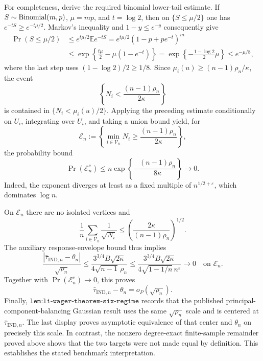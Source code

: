 For completeness, derive the required binomial lower-tail estimate.  If \(S\sim{\rm Binomial}(m,p)\), \(\mu=mp\), and \(t=\log2\), then on \(\{S\le\mu/2\}\) one has \(e^{-tS}\ge e^{-t\mu/2}\).  Markov's inequality and \(1-y\le e^{-y}\) consequently give
\[
\begin{aligned}
\Pr(S\le\mu/2)
&\le e^{t\mu/2}\mathbb E e^{-tS}
=e^{t\mu/2}(1-p+pe^{-t})^m\\
&\le\exp\!\left\{\frac{t\mu}{2}-\mu(1-e^{-t})\right\}
=\exp\!\left\{-\frac{1-\log2}{2}\mu\right\}
\le e^{-\mu/8},
\end{aligned}
\]
where the last step uses \((1-\log2)/2\ge1/8\).  Since \(\mu_i(u)\ge(n-1)\rho_n/\kappa\), the event
\[
\left\{N_i<\frac{(n-1)\rho_n}{2\kappa}\right\}
\]
is contained in \(\{N_i<\mu_i(u)/2\}\).  Applying the preceding estimate conditionally on \(U_i\), integrating over \(U_i\), and taking a union bound yield, for
\[
\mathcal E_n:=\left\{\min_{i\in\mathcal V_n}N_i
\ge\frac{(n-1)\rho_n}{2\kappa}\right\},
\]
the probability bound
\[
\Pr(\mathcal E_n^c)
\le n\exp\!\left\{-\frac{(n-1)\rho_n}{8\kappa}\right\}
\longrightarrow0.
\]
Indeed, the exponent diverges at least as a fixed multiple of \(n^{1/2+\varepsilon}\), which dominates \(\log n\).

On \(\mathcal E_n\) there are no isolated vertices and
\[
\frac1n\sum_{i\in\mathcal V_n}\frac1{\sqrt{N_i}}
\le\left(\frac{2\kappa}{(n-1)\rho_n}\right)^{1/2}.
\]
The auxiliary response-envelope bound thus implies
\[
\frac{\left|\bar\tau_{\mathrm{IND},n}-\theta_n\right|}{\sqrt{\rho_n}}
\le\frac{3^{3/4}B\sqrt{2\kappa}}{4\sqrt{n-1}\,\rho_n}
\le\frac{3^{3/4}B\sqrt{2\kappa}}{4\sqrt{1-1/n}\,n^{\varepsilon}}
\longrightarrow0
\quad\text{on }\mathcal E_n.
\]
Together with \(\Pr(\mathcal E_n^c)\to0\), this proves
\[
\bar\tau_{\mathrm{IND},n}-\theta_n=o_P(\sqrt{\rho_n}).
\]
Finally, \(\texttt{lem:li-wager-theorem-six-regime}\) records that the published principal-component-balancing Gaussian result uses the same \(\sqrt{\rho_n}\) scale and is centered at \(\bar\tau_{\mathrm{IND},n}\).  The last display proves asymptotic equivalence of that center and \(\theta_n\) on precisely this scale.  In contrast, the nonzero degree-exact finite-sample remainder proved above shows that the two targets were not made equal by definition.  This establishes the stated benchmark interpretation.